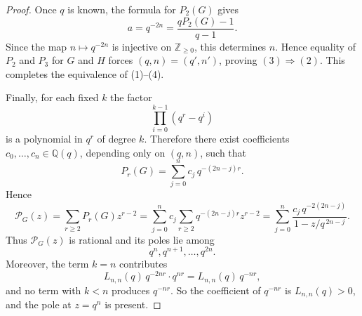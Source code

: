\documentclass[10pt,a4paper]{amsart}
\begin{document}
\begin{proof}
Once $q$ is known, the formula for $P_2(G)$ gives
\[
a=q^{-2n}=\frac{qP_2(G)-1}{q-1}.
\]
Since the map $n\mapsto q^{-2n}$ is injective on $\mathbb Z_{\ge0}$, this determines $n$.
Hence equality of $P_2$ and $P_3$ for $G$ and $H$ forces $(q,n)=(q',n')$, proving $(3)\Rightarrow(2)$.
This completes the equivalence of (1)--(4).

Finally, for each fixed $k$ the factor
\[
\prod_{i=0}^{k-1}(q^r-q^i)
\]
is a polynomial in $q^r$ of degree $k$.
Therefore there exist coefficients $c_0,\dots,c_n\in \mathbb Q(q)$, depending only on $(q,n)$, such that
\[
P_r(G)=\sum_{j=0}^{n} c_j\,q^{-(2n-j)r}.
\]
Hence
\[
\mathcal P_G(z)
=
\sum_{r\ge2}P_r(G)z^{r-2}
=
\sum_{j=0}^{n} c_j\sum_{r\ge2}q^{-(2n-j)r}z^{r-2}
=
\sum_{j=0}^{n}\frac{c_j\,q^{-2(2n-j)}}{1-z/q^{\,2n-j}}.
\]
Thus $\mathcal P_G(z)$ is rational and its poles lie among
\[
q^n,q^{n+1},\dots,q^{2n}.
\]
Moreover, the term $k=n$ contributes
\[
L_{n,n}(q)\,q^{-2nr}\cdot q^{nr}=L_{n,n}(q)\,q^{-nr},
\]
and no term with $k<n$ produces $q^{-nr}$.
So the coefficient of $q^{-nr}$ is $L_{n,n}(q)>0$, and the pole at $z=q^n$ is present.
\end{proof}
\end{document}
